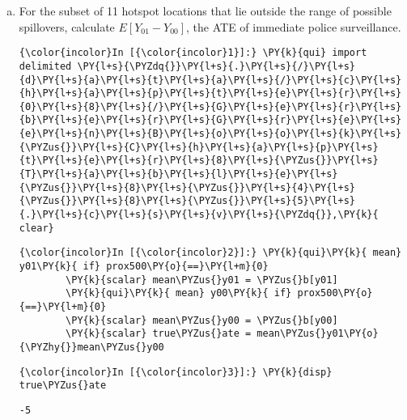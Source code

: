 \documentclass[11pt,notitlepage]{article}\usepackage[]{graphicx}\usepackage[]{color}
\makeatletter
\newenvironment{kframe}{%
 \def\at@end@of@kframe{}%
 \ifinner\ifhmode%
  \def\at@end@of@kframe{\end{minipage}}%
  \begin{minipage}{\columnwidth}%
 \fi\fi%
 \def\FrameCommand##1{\hskip\@totalleftmargin \hskip-\fboxsep
 \colorbox{shadecolor}{##1}\hskip-\fboxsep
     \hskip-\linewidth \hskip-\@totalleftmargin \hskip\columnwidth}%
 \MakeFramed {\advance\hsize-\width
   \@totalleftmargin\z@ \linewidth\hsize
   \@setminipage}}%
 {\par\unskip\endMakeFramed%
 \at@end@of@kframe}
\newenvironment{knitrout}{}{} %
\makeatother
\begin{document}
\begin{enumerate}[a)]
\item For the subset of 11 hotspot locations that lie outside the range of possible spillovers, calculate $E[Y_{01} - Y_{00}]$, the ATE of immediate police surveillance.
\begin{knitrout}
\color{fgcolor}\begin{kframe}
    \begin{Verbatim}[commandchars=\\\{\}]
{\color{incolor}In [{\color{incolor}1}]:} \PY{k}{qui} import delimited \PY{l+s}{\PYZdq{}}\PY{l+s}{.}\PY{l+s}{/}\PY{l+s}{d}\PY{l+s}{a}\PY{l+s}{t}\PY{l+s}{a}\PY{l+s}{/}\PY{l+s}{c}\PY{l+s}{h}\PY{l+s}{a}\PY{l+s}{p}\PY{l+s}{t}\PY{l+s}{e}\PY{l+s}{r}\PY{l+s}{0}\PY{l+s}{8}\PY{l+s}{/}\PY{l+s}{G}\PY{l+s}{e}\PY{l+s}{r}\PY{l+s}{b}\PY{l+s}{e}\PY{l+s}{r}\PY{l+s}{G}\PY{l+s}{r}\PY{l+s}{e}\PY{l+s}{e}\PY{l+s}{n}\PY{l+s}{B}\PY{l+s}{o}\PY{l+s}{o}\PY{l+s}{k}\PY{l+s}{\PYZus{}}\PY{l+s}{C}\PY{l+s}{h}\PY{l+s}{a}\PY{l+s}{p}\PY{l+s}{t}\PY{l+s}{e}\PY{l+s}{r}\PY{l+s}{8}\PY{l+s}{\PYZus{}}\PY{l+s}{T}\PY{l+s}{a}\PY{l+s}{b}\PY{l+s}{l}\PY{l+s}{e}\PY{l+s}{\PYZus{}}\PY{l+s}{8}\PY{l+s}{\PYZus{}}\PY{l+s}{4}\PY{l+s}{\PYZus{}}\PY{l+s}{8}\PY{l+s}{\PYZus{}}\PY{l+s}{5}\PY{l+s}{.}\PY{l+s}{c}\PY{l+s}{s}\PY{l+s}{v}\PY{l+s}{\PYZdq{}},\PY{k}{ clear}
\end{Verbatim}

    \begin{Verbatim}[commandchars=\\\{\}]
{\color{incolor}In [{\color{incolor}2}]:} \PY{k}{qui}\PY{k}{ mean} y01\PY{k}{ if} prox500\PY{o}{==}\PY{l+m}{0}
        \PY{k}{scalar} mean\PYZus{}y01 = \PYZus{}b[y01]
        \PY{k}{qui}\PY{k}{ mean} y00\PY{k}{ if} prox500\PY{o}{==}\PY{l+m}{0}
        \PY{k}{scalar} mean\PYZus{}y00 = \PYZus{}b[y00]
        \PY{k}{scalar} true\PYZus{}ate = mean\PYZus{}y01\PY{o}{\PYZhy{}}mean\PYZus{}y00
\end{Verbatim}

    \begin{Verbatim}[commandchars=\\\{\}]
{\color{incolor}In [{\color{incolor}3}]:} \PY{k}{disp} true\PYZus{}ate
\end{Verbatim}

    \begin{Verbatim}[commandchars=\\\{\}]
-5
    \end{Verbatim}


\end{kframe}
\end{knitrout}
\end{enumerate}
\end{document}
